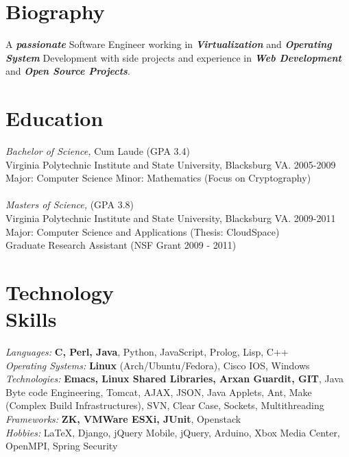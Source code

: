 \documentclass[line,margin]{res}
\begin{document}
\address{2132 Sterling Green Dr, Morrisville, NC 27560}
\address{Email: vtwoods@gmail.com --- Cell: (703)475-1337}

 
\begin{resume}
 
\section{Biography} A \textbf{\emph{passionate}} Software Engineer working in \textbf{\emph{Virtualization}} and \textbf{\emph{Operating System}} Development with side projects and experience in \textbf{\emph{Web Development}} and \textbf{\emph{Open Source Projects}}. 
 
 
\section{Education} {\sl Bachelor of Science,} Cum Laude (GPA 3.4) \\
                Virginia Polytechnic Institute and State University, Blacksburg VA. 2005-2009 \\
                Major: Computer Science Minor: Mathematics (Focus on Cryptography)\\
\\[-5pt]
                {\sl Masters of Science,} (GPA 3.8) \\
                Virginia Polytechnic Institute and State University, Blacksburg VA. 2009-2011 \\
                Major: Computer Science and Applications (Thesis:  CloudSpace) \\
                Graduate Research Assistant (NSF Grant 2009 - 2011)
 
\section{Technology \\ Skills} {\sl Languages:} \textbf{C, Perl, Java}, Python, JavaScript, Prolog, Lisp, C++ \\
                {\sl Operating Systems:} \textbf{Linux} (Arch/Ubuntu/Fedora), Cisco IOS, Windows \\
                {\sl Technologies:} \textbf{Emacs, Linux Shared Libraries, Arxan Guardit, GIT}, Java Byte code Engineering, Tomcat, AJAX, JSON, Java Applets, Ant, Make (Complex Build Infrastructures), SVN, Clear Case, Sockets, Multithreading \\
                {\sl Frameworks:} \textbf{ZK, VMWare ESXi, JUnit}, Openstack \\
                {\sl Hobbies:} \LaTeX, Django, jQuery Mobile, jQuery, Arduino, Xbox Media Center, OpenMPI, Spring Security
 

\end{resume}
\end{document}
